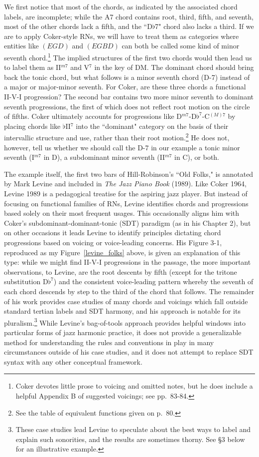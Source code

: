We first notice that most of the chords, as indicated by the associated chord labels, are incomplete; while the A7 chord contains root, third, fifth, and seventh, most of the other chords lack a fifth, and the ``D$\flat$7" chord also lacks a third.  If we are to apply Coker-style RNs, we will have to treat them as categories where entities like $(EGD)$ and $(EGBD)$ can both be called some kind of minor seventh chord.\footnote{Coker devotes little prose to voicing and omitted notes, but he does include a helpful Appendix B of suggested voicings; see pp.\ 83-84.}  The implied structures of the first two chords would then lead us to label them as II$^{m7}$ and V$^7$ in the key of DM.  The dominant chord should bring back the tonic chord, but what follows is a minor seventh chord (D-7) instead of a major or major-minor seventh.  For Coker, are these three chords a functional II-V-I progression?  The second bar contains two more minor seventh to dominant seventh progressions, the first of which does not reflect root motion on the circle of fifths.  Coker ultimately accounts for progressions like D$^{m7}$-D$\flat^7$-C$^{(M)7}$ by placing chords like $\flat$II$^7$ into the ``dominant" category on the basis of their intervallic structure and use, rather than their root motion.\footnote{See the table of equivalent functions given on p.\ 80.}  He does not, however, tell us whether we should call the D-7 in our example a tonic minor seventh (I$^{m7}$ in D), a subdominant minor seventh (II$^{m7}$ in C), or both.

The example itself, the first two bars of Hill-Robinson's ``Old Folks," is annotated by Mark Levine and included in \emph{The Jazz Piano Book} (1989).  Like Coker 1964, Levine 1989 is a pedagogical treatise for the aspiring jazz player.  But instead of focusing on functional families of RNs, Levine identifies chords and progressions based solely on their most frequent usages.  This occasionally aligns him with Coker's subdominant-dominant-tonic (SDT) paradigm (as in his Chapter 2), but on other occasions it leads Levine to identify principles dictating chord progressions based on voicing or voice-leading concerns.  His Figure 3-1, reproduced as my Figure~\ref{levine_folks} above, is given an explanation of this type: while we might find II-V-I progressions in the passage, the more important observations, to Levine, are the root descents by fifth (except for the tritone substitution D$\flat^7$) and the consistent voice-leading pattern whereby the seventh of each chord descends by step to the third of the chord that follows.  The remainder of his work provides case studies of many chords and voicings which fall outside standard tertian labels and SDT harmony, and his approach is notable for its pluralism.\footnote{These case studies lead Levine to speculate about the best ways to label and explain such sonorities, and the results are sometimes thorny.  See \S 3 below for an illustrative example.}  While Levine's bag-of-tools approach provides helpful windows into particular forms of jazz harmonic practice, it does not provide a generalizable method for understanding the rules and conventions in play in many circumstances outside of his case studies, and it does not attempt to replace SDT syntax with any other conceptual framework.

